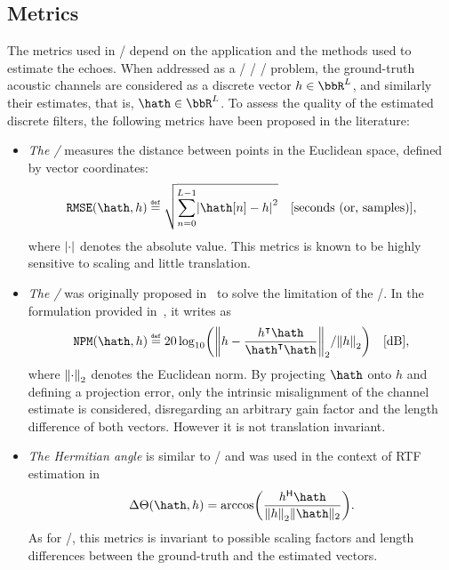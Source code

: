\subsection{Metrics}\label{subsec:estimation:metrics}
The metrics used in \AER/ depend on the application and the methods used to estimate the echoes.
When addressed as a \FIR/ \SIMO/ \BCE/ problem, the ground-truth acoustic channels are considered as a discrete vector $h \in \bbR^L$, and similarly their estimates, that is, $\hath \in \bbR^L$.
To assess the quality of the estimated discrete filters, the following metrics have been proposed in the literature:
\begin{itemize}
    \item \textit{The \RMSEtxt/}  measures the distance between points in the Euclidean space, defined by vector coordinates:
    \begin{equation}
        \RMSE(\hath, h) \eqdef \sqrt{\sum_{n=0}^{L-1} \abs{\hath[n] - h}^2} \quad \text{[seconds (or, samples)]}
        ,
    \end{equation}
    where $\abs{\cdot}$ denotes the absolute value.
    This metrics is known to be highly sensitive to scaling and little translation.

    \item \textit{The \NPMtxt/}  was originally proposed in~ to solve the limitation of the \RMSEtxt/.
    In the formulation provided in~, it writes as
    \begin{equation}
        \NPM(\hath,h) \eqdef 20 \log_{10} \kparen{ \norm{h - \frac{\ktranspose{h}\hath}{\ktranspose{\hath} \hath}}_2 / \norm{h}_2} \quad \text{[dB]}
        ,
    \end{equation}
    where $\norm{\cdot}_2$ denotes the Euclidean norm.
    By projecting $\hath$ onto $h$ and defining a projection error, only the intrinsic misalignment of the channel estimate is considered, disregarding an arbitrary gain factor and the length difference of both vectors.
    However it is not translation invariant.

    \item \textit{The Hermitian angle} is similar to \NPMtxt/ and was used in the context of RTF estimation in~
    \begin{equation}
        \Delta\Theta(\hath,h) = \arccos\kparen{\frac{\khermitian{h}\hath}{\norm{h}_2\|\hath\|_2}}
        .
    \end{equation}
    As for \NPMtxt/, this metrics is invariant to possible scaling factors and length differences between the ground-truth and the estimated vectors.
\end{itemize}


